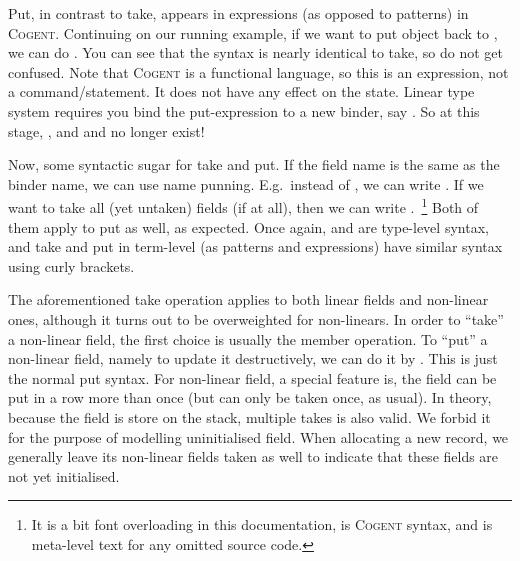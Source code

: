 \documentclass[a4paper]{article}
\newcommand{\cogent}{\textsc{Cogent}\xspace}
\begin{document}
Put, in contrast to take, appears in expressions (as opposed to patterns) in \cogent. Continuing on our running example, if we want to put object  back to
, we can do . You can see that the syntax is nearly identical to take, so do not get confused.
Note that \cogent is a functional language, so this is an expression, not a command/statement. It does not have any effect on the state.
Linear type system requires you bind the put-expression to a new binder, say .
So at this stage, , and  and  no longer exist!

Now, some syntactic sugar for take and put. If the field name is the same as the binder name, we can use name punning. E.g.\ instead of
, we can write . If we want to take all (yet untaken) fields (if at all), then we can write
.~\footnote{It is a bit font overloading in this documentation,
 is \cogent syntax, and  is meta-level text for any omitted source code.}
Both of them apply to put as well, as expected. Once again,  and  are type-level
syntax, and take and put in term-level (as patterns and expressions) have similar syntax using curly brackets.

The aforementioned take operation applies to both linear fields and non-linear ones, although it turns out to be overweighted for non-linears. In order to ``take'' a non-linear field, the first
choice is usually the member operation. To ``put'' a non-linear field, namely to update it
destructively, we can do it by . This is just the normal
put syntax. For non-linear field, a special feature is, the field can be put
in a row more than once (but can only be taken once, as usual). In theory, because the field
is store on the stack, multiple takes is also valid. We forbid it for the purpose of modelling
uninitialised field. When allocating a new record, we generally leave its non-linear fields
taken as well to indicate that these fields are not yet initialised.
\end{document}
